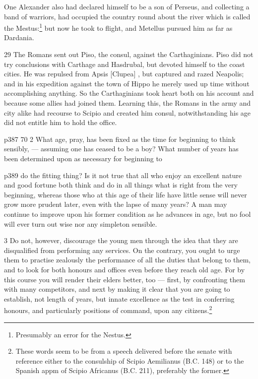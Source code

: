 One Alexander also had declared himself to be a son of Perseus, and collecting a band of warriors, had occupied the country round about the river which is called the Mestus:\texthebrew{⁠}\footnote{Presumably an error for the Nestus.

} but now he took to flight, and Metellus pursued him as far as Dardania.

29
The Romans sent out Piso, the consul, against the Carthaginians. Piso did not try conclusions with Carthage and Hasdrubal, but devoted himself to the coast cities. He was repulsed from Apsis [Clupea] , but captured and razed Neapolis; and in his expedition against the town of Hippo he merely used up time without accomplishing anything. So the Carthaginians took heart both on his account and because some allies had joined them. Learning this, the Romans in the army and city alike had recourse to Scipio and created him consul, notwithstanding his age did not entitle him to hold the office.

p387
70
2 What age, pray, has been fixed as the time for beginning to think sensibly, \texthebrew{—} assuming one has ceased to be a boy? What number of years has been determined upon as necessary for beginning to

p389 do the fitting thing? Is it not true that all who enjoy an excellent nature and good fortune both think and do in all things what is right from the very beginning, whereas those who at this age of their life have little sense will never grow more prudent later, even with the lapse of many years? A man may continue to improve upon his former condition as he advances in age, but no fool will ever turn out wise nor any simpleton sensible.

3
Do not, however, discourage the young men through the idea that they are disqualified from performing any services. On the contrary, you ought to urge them to practise zealously the performance of all the duties that belong to them, and to look for both honours and offices even before they reach old age. For by this course you will render their elders better, too \texthebrew{—} first, by confronting them with many competitors, and next by making it clear that you are going to establish, not length of years, but innate excellence as the test in conferring honours, and particularly positions of command, upon any citizens.\footnote{These words seem to be from a speech delivered before the senate with reference either to the consul­ship of Scipio Aemilianus (B.C. 148) or to the Spanish appm of Scipio Africanus (B.C. 211), preferably the former.

}

